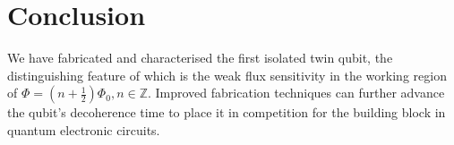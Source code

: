 \section{Conclusion}
\noindent We have fabricated and characterised the first isolated twin qubit, the
distinguishing feature of which is the weak flux sensitivity in the working region of
$ \Phi = (n+\frac{1}{2})\Phi_0, n\in\mathbb{Z} $. Improved fabrication techniques can further advance
the qubit's decoherence time to place it in competition for the building block in quantum
electronic circuits.


